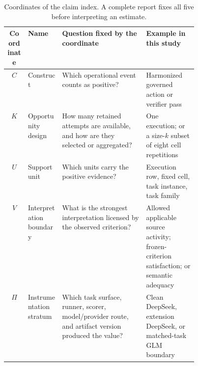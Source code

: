 \begin{table}[H]
\centering
\caption{Coordinates of the claim index. A complete report fixes all five before interpreting an estimate.}
\label{tab:claim-index}
\small
\begin{tabularx}{\linewidth}{@{}cL{0.18\linewidth}YL{0.27\linewidth}@{}}
\toprule
Coordinate & Name & Question fixed by the coordinate & Example in this study \\
\midrule
$C$ & Construct & Which operational event counts as positive? & Harmonized governed action or verifier pass \\
$K$ & Opportunity design & How many retained attempts are available, and how are they selected or aggregated? & One execution; or a size-$k$ subset of eight cell repetitions \\
$U$ & Support unit & Which units carry the positive evidence? & Execution row, fixed cell, task instance, task family \\
$V$ & Interpretation boundary & What is the strongest interpretation licensed by the observed criterion? & Allowed applicable source activity; frozen-criterion satisfaction; or semantic adequacy \\
$\Pi$ & Instrumentation stratum & Which task surface, runner, scorer, model/provider route, and artifact version produced the value? & Clean DeepSeek, extension DeepSeek, or matched-task GLM boundary \\
\bottomrule
\end{tabularx}
\end{table}
